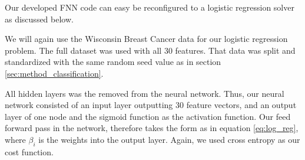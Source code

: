 Our developed FNN code can easy be reconfigured to a logistic regression
solver as discussed below.

We will again use the Wisconsin Breast Cancer data for our logistic regression
problem. The full dataset was used with all 30 features. That data was split
and standardized with the same random seed value as in section
\ref{sec:method_classification}. 

All hidden layers was the removed from the neural network. Thus, our neural
network consisted of an input layer outputting 30 feature vectors, and an
output layer of one node and the sigmoid function as the activation function.
Our feed forward pass in the network, therefore takes the form as in equation
\ref{eq:log_reg}, where $\beta _i$ is the weights into the output layer. 
Again, we used cross entropy as our cost function.  






